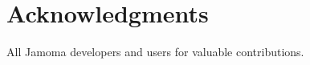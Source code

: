 \documentclass{sig-alternate}
\begin{document}
\section{Acknowledgments} %
\label{sec:acknowledgments}

All Jamoma developers and users for valuable contributions. 





%

%


\balancecolumns %
\end{document}
